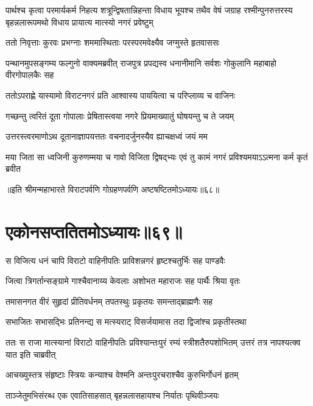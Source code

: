 \threelineshloka
{पार्थश्च कृत्वा परमार्यकर्म निहत्य शत्रून्द्विषतान्निहन्ता}
{विधाय भूयश्च तथैव वेषं जग्राह रश्मीन्पुनरुत्तरस्य}
{बृहन्नलारूपमथो विधाय प्रायात्य मात्स्यो नगरं प्रवेष्टुम्}



\twolineshloka
{ततो निवृत्ताः कुरवः प्रभग्नाः शममास्थिताः}
{परस्परमवेक्ष्यैव जग्मुस्ते हृतवाससः}


\threelineshloka
{पन्थानमुपसङ्गम्य फल्गुनो वाक्यमब्रवीत्}
{राजपुत्र प्रपद्यस्व धनानीमानि सर्वशः}
{गोकुलानि महाबाहो वीरगोपालकैः सह}


\twolineshloka
{ततोऽपराह्णे यास्यामो विराटनगरं प्रति}
{आश्वास्य पाययित्वा च परिप्लाव्य च वाजिनः}



\twolineshloka
{गच्छन्तु त्वरितं दूता गोपालाः प्रेषितास्त्वया}
{नगरे प्रियमाख्यातुं घोषयन्तु च ते जयम्}


\twolineshloka
{उत्तरस्त्वरमाणोऽथ दूतानाज्ञापयत्ततः}
{वचनादर्जुनस्यैव ह्याचक्षध्वं जयं मम}


\twolineshloka
{मया जिता सा ध्वजिनी कुरुणम्मया च गावो विजिता द्विषद्भ्यः}
{एवं तु कामं नगरं प्रविश्यमयाऽऽत्मना कर्म कृतं ब्रवीत}

॥इति श्रीमन्महाभारते विराटपर्वणि गोग्रहणपर्वणि अष्टषष्टितमोऽध्यायः॥६८॥

\chapter{एकोनसप्ततितमोऽध्यायः॥६९॥}

\twolineshloka
{स विजित्य धनं चापि विराटो वाहिनीपतिः}
{प्राविशन्नगरं हृष्टश्चतुर्भिः सह पाण्डवैः}


\twolineshloka
{जित्वा त्रिगर्तान्सङ्ग्रामे गाश्चैवानाय्य केवलाः}
{अशोभत महाराजः सह पार्थैः श्रिया वृतः}


\twolineshloka
{तमासनगत वीरं सुहृदां प्रीतिवर्धनम्}
{तपतस्थुः प्रकृतयः समन्ताद्ब्राह्मणैः सह}


\twolineshloka
{सभाजितः सभासद्भिः प्रतिनन्द्य स मत्स्यराट्}
{विसर्जयामास तदा द्विजांश्च प्रकृतीस्तथा}


\threelineshloka
{ततः स राजा मात्स्यानां विराटो वाहिनीपतिः}
{प्रविश्यान्तःपुरं रम्यं स्त्रीशतैरुपशोभितम्}
{उत्तरं तत्र नापश्यत्क्व यात इति चाब्रवीत्}


\twolineshloka
{आचख्युस्तत्र संहृष्टाः स्त्रियः कन्याश्च वेश्मनि}
{अन्तःपुरचराश्चैव कुरुभिर्गोधनं हृतम्}


\twolineshloka
{ताञ्जेतुमभिसंरब्ध एक एवातिसाहसात्}
{बृहन्नलासहायश्च निर्यातः पृथिवीञ्जयः}


